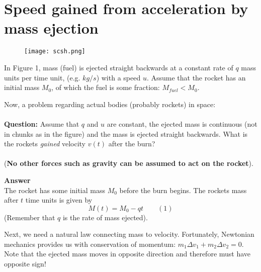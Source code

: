\documentclass{article}
\begin{document}
\newpage
\section*{Speed gained from acceleration by mass ejection}

\begin{figure}[H]
\begin{center} 
\texttt{[image: scsh.png]}
\caption{}
\label{fig:fig1}
\end{center}
\end{figure}

In Figure 1, mass (fuel) is ejected straight backwards at a constant rate of $q$ mass units per time unit, (e.g. $kg/s$) with a speed $u$. Assume that the rocket has an initial mass $M_0$, of which the fuel is some fraction: $M_{fuel}<M_0$. 

Now, a problem regarding actual bodies (probably rockets) in space:
\\ \\
\textbf{Question:} Assume that $q$ and $u$ are constant, the ejected mass is continuous (not in chunks as in the figure) and the mass is ejected straight backwards. What is the rockets \textit{gained} velocity $v(t)$ after the burn? 
\\ \\
(\textbf{No other forces such as gravity can be assumed to act on the rocket}).

\newpage
\noindent
\textbf{Answer}
\\
The rocket has some initial mass $M_0$ before the burn begins. The rockets mass after $t$ time units is given by 
\begin{equation*}
    M(t)=M_0-qt \quad \quad (1)   
\end{equation*}
(Remember that $q$ is the rate of mass ejected). 

Next, we need a natural law connecting mass to velocity. Fortunately, Newtonian mechanics provides us with conservation of momentum: $m_1\Delta v_1+m_2\Delta v_2=0$. Note that the ejected mass moves in opposite direction and therefore must have opposite sign! 
\end{document}
